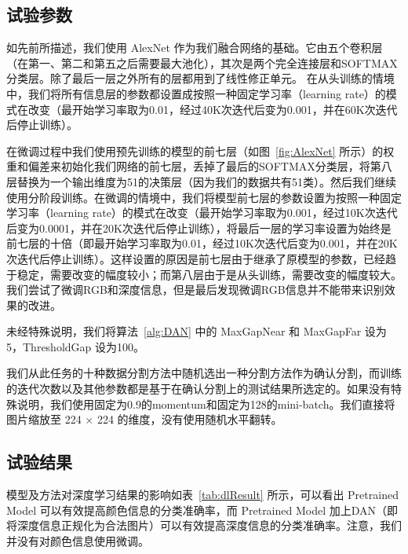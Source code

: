 \subsection{试验参数}

如先前所描述，我们使用 AlexNet 作为我们融合网络的基础。它由五个卷积层（在第一、第二和第五之后需要最大池化），其次是两个完全连接层和SOFTMAX分类层。除了最后一层之外所有的层都用到了线性修正单元。
在从头训练的情境中，我们将所有信息层的参数都设置成按照一种固定学习率（learning rate）的模式在改变（最开始学习率取为0.01，经过40K次迭代后变为0.001，并在60K次迭代后停止训练）。

在微调过程中我们使用预先训练的模型的前七层（如图~\ref{fig:AlexNet} 所示）的权重和偏差来初始化我们网络的前七层，丢掉了最后的SOFTMAX分类层，将第八层替换为一个输出维度为51的决策层（因为我们的数据共有51类）。然后我们继续使用分阶段训练。在微调的情境中，我们将模型前七层的参数设置为按照一种固定学习率（learning rate）的模式在改变（最开始学习率取为0.001，经过10K次迭代后变为0.0001，并在20K次迭代后停止训练），将最后一层的学习率设置为始终是前七层的十倍（即最开始学习率取为0.01，经过10K次迭代后变为0.001，并在20K次迭代后停止训练）。这样设置的原因是前七层由于继承了原模型的参数，已经趋于稳定，需要改变的幅度较小；而第八层由于是从头训练，需要改变的幅度较大。我们尝试了微调RGB和深度信息，但是最后发现微调RGB信息并不能带来识别效果的改进。

未经特殊说明，我们将算法~\ref{alg:DAN} 中的 MaxGapNear 和 MaxGapFar 设为 5，ThresholdGap 设为100。

我们从此任务的十种数据分割方法中随机选出一种分割方法作为确认分割，而训练的迭代次数以及其他参数都是基于在确认分割上的测试结果所选定的。如果没有特殊说明，我们使用固定为0.9的momentum和固定为128的mini-batch。我们直接将图片缩放至 224 $\times$ 224 的维度，没有使用随机水平翻转。

\subsection{试验结果}

模型及方法对深度学习结果的影响如表~\ref{tab:dlResult} 所示，可以看出 Pretrained Model 可以有效提高颜色信息的分类准确率，而 Pretrained Model 加上DAN（即将深度信息正规化为合法图片）可以有效提高深度信息的分类准确率。注意，我们并没有对颜色信息使用微调。

